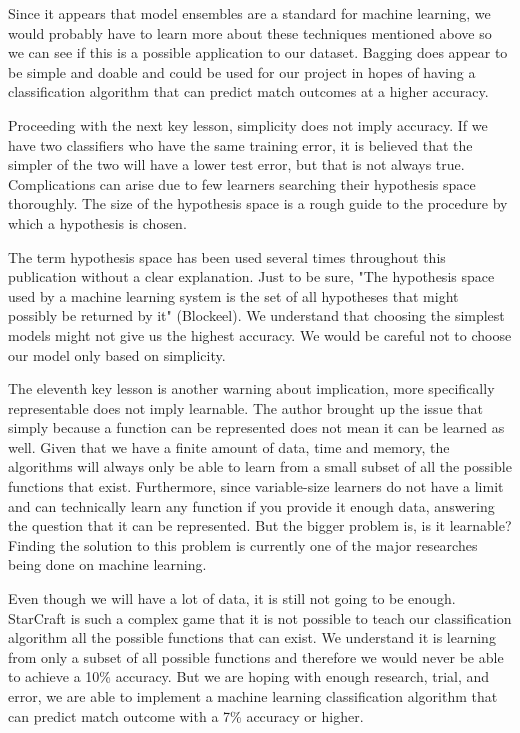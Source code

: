 \documentclass[a4paper,12pt]{report}
\begin{document}
Since it appears that model ensembles are a standard for machine learning, we would probably have to learn more about these techniques mentioned above so we can see if this is a possible application to our dataset. Bagging does appear to be simple and doable and could be used for our project in hopes of having a classification algorithm that can predict match outcomes at a higher accuracy.

Proceeding with the next key lesson, simplicity does not imply accuracy. If we have two classifiers who have the same training error, it is believed that the simpler of the two will have a lower test error, but that is not always true. Complications can arise due to few learners searching their hypothesis space thoroughly. The size of the hypothesis space is a rough guide to the procedure by which a hypothesis is chosen.

The term hypothesis space has been used several times throughout this publication without a clear explanation. Just to be sure, "The hypothesis space used by a machine learning system is the set of all hypotheses that might possibly be returned by it" (Blockeel). We understand that choosing the simplest models might not give us the highest accuracy. We would be careful not to choose our model only based on simplicity.

The eleventh key lesson is another warning about implication, more specifically representable does not imply learnable. The author brought up the issue that simply because a function can be represented does not mean it can be learned as well. Given that we have a finite amount of data, time and memory, the algorithms will always only be able to learn from a small subset of all the possible functions that exist. Furthermore, since variable-size learners do not have a limit and can technically learn any function if you provide it enough data, answering the question that it can be represented. But the bigger problem is, is it learnable? Finding the solution to this problem is currently one of the major researches being done on machine learning.

Even though we will have a lot of data, it is still not going to be enough. StarCraft is such a complex game that it is not possible to teach our classification algorithm all the possible functions that can exist. We understand it is learning from only a subset of all possible functions and therefore we would never be able to achieve a 10\% accuracy. But we are hoping with enough research, trial, and error, we are able to implement a machine learning classification algorithm that can predict match outcome with a 7\% accuracy or higher.
\end{document}

